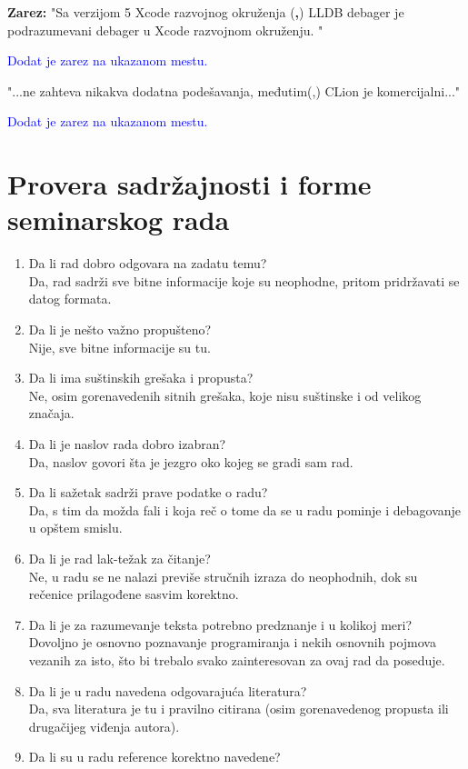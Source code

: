 \documentclass[a4paper]{report}
\newcommand{\odgovor}[1]{\textcolor{blue}{#1}}
\begin{document}
\textbf{Zarez: } "{}Sa verzijom 5 Xcode razvojnog okruženja (\textbf{,}) LLDB debager je podrazumevani debager u Xcode razvojnom okruženju. "

\odgovor{Dodat je zarez na ukazanom mestu.}

"...ne zahteva nikakva dodatna podešavanja, međutim(,) CLion je komercijalni..."

\odgovor{Dodat je zarez na ukazanom mestu.}
\section{Provera sadržajnosti i forme seminarskog rada}

\begin{enumerate}
\item Da li rad dobro odgovara na zadatu temu?\\
Da, rad sadrži sve bitne informacije koje su neophodne, pritom pridržavati se datog formata.
\item Da li je nešto važno propušteno?\\
Nije, sve bitne informacije su tu.
\item Da li ima suštinskih grešaka i propusta?\\
Ne, osim gorenavedenih sitnih grešaka, koje nisu suštinske i od velikog značaja.
\item Da li je naslov rada dobro izabran?\\
Da, naslov govori šta je jezgro oko kojeg se gradi sam rad.
\item Da li sažetak sadrži prave podatke o radu?\\
Da, s tim da možda fali i koja reč o tome da se u radu pominje i debagovanje u opštem smislu.
\item Da li je rad lak-težak za čitanje?\\
Ne, u radu se ne nalazi previše stručnih izraza do neophodnih, dok su rečenice prilagođene sasvim korektno.
\item Da li je za razumevanje teksta potrebno predznanje i u kolikoj meri?\\
Dovoljno je osnovno poznavanje programiranja i nekih osnovnih pojmova vezanih za isto,
što bi trebalo svako zainteresovan za ovaj rad da poseduje.
\item Da li je u radu navedena odgovarajuća literatura?\\
Da, sva literatura je tu i pravilno citirana (osim gorenavedenog propusta ili drugačijeg viđenja autora).
\item Da li su u radu reference korektno navedene?\\

\end{enumerate}
\end{document}
